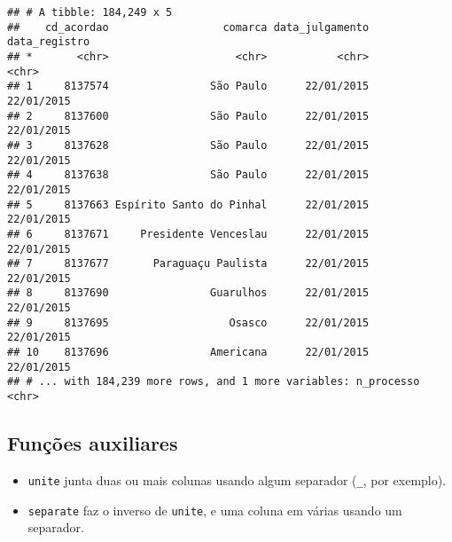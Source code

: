 \documentclass[]{book}
\newenvironment{Shaded}{\begin{snugshade}}{\end{snugshade}}
\newcommand{\KeywordTok}[1]{\textcolor[rgb]{0.13,0.29,0.53}{\textbf{{#1}}}}
\newcommand{\DataTypeTok}[1]{\textcolor[rgb]{0.13,0.29,0.53}{{#1}}}
\newcommand{\StringTok}[1]{\textcolor[rgb]{0.31,0.60,0.02}{{#1}}}
\newcommand{\OtherTok}[1]{\textcolor[rgb]{0.56,0.35,0.01}{{#1}}}
\newcommand{\NormalTok}[1]{{#1}}
\providecommand{\tightlist}{%
  \setlength{\itemsep}{0pt}\setlength{\parskip}{0pt}}
\begin{document}
\begin{verbatim}
## # A tibble: 184,249 x 5
##    cd_acordao                  comarca data_julgamento data_registro
## *       <chr>                    <chr>           <chr>         <chr>
## 1     8137574                São Paulo      22/01/2015    22/01/2015
## 2     8137600                São Paulo      22/01/2015    22/01/2015
## 3     8137628                São Paulo      22/01/2015    22/01/2015
## 4     8137638                São Paulo      22/01/2015    22/01/2015
## 5     8137663 Espírito Santo do Pinhal      22/01/2015    22/01/2015
## 6     8137671     Presidente Venceslau      22/01/2015    22/01/2015
## 7     8137677       Paraguaçu Paulista      22/01/2015    22/01/2015
## 8     8137690                Guarulhos      22/01/2015    22/01/2015
## 9     8137695                   Osasco      22/01/2015    22/01/2015
## 10    8137696                Americana      22/01/2015    22/01/2015
## # ... with 184,239 more rows, and 1 more variables: n_processo <chr>
\end{verbatim}

\subsection{Funções auxiliares}\label{funcoes-auxiliares}

\begin{itemize}
\tightlist
\item
  \texttt{unite} junta duas ou mais colunas usando algum separador
  (\texttt{\_}, por exemplo).
\item
  \texttt{separate} faz o inverso de \texttt{unite}, e uma coluna em
  várias usando um separador.
\end{itemize}

\begin{Shaded}
\end{Shaded}
\end{document}

